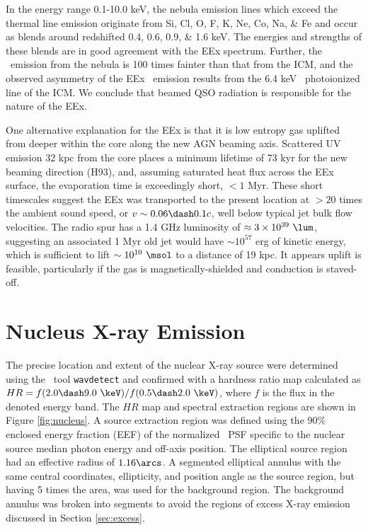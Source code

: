 \documentclass[useAMS,usenatbib]{mn2e}
\begin{document}
In the energy range 0.1-10.0 keV, the nebula emission lines which
exceed the thermal line emission originate from Si, Cl, O, F, K, Ne,
Co, Na, \& Fe and occur as blends around redshifted 0.4, 0.6, 0.9, \&
1.6 keV. The energies and strengths of these blends are in good
agreement with the EEx spectrum. Further, the \feka\ emission from the
nebula is 100 times fainter than that from the ICM, and the observed
asymmetry of the EEx \feka\ emission results from the 6.4 keV
\feka\ photoionized line of the ICM. We conclude that beamed QSO
radiation is responsible for the nature of the EEx.

One alternative explanation for the EEx is that it is low entropy gas
uplifted from deeper within the core along the new AGN beaming
axis. Scattered UV emission 32 kpc from the core places a minimum
lifetime of 73 kyr for the new beaming direction (H93), and, assuming
saturated heat flux across the EEx surface, the evaporation time is
exceedingly short, $< 1$ Myr. These short timescales suggest the EEx
was transported to the present location at $> 20$ times the ambient
sound speed, or $v \sim 0.06 \dash 0.1c$, well below typical jet bulk
flow velocities. The radio spur has a 1.4 GHz luminosity of $\approx 3
\times 10^{39} ~\lum$, suggesting an associated 1 Myr old jet would
have $\sim 10^{57}$ erg of kinetic energy, which is sufficient to lift
$\sim 10^{10} ~\msol$ to a distance of 19 kpc. It appears uplift is
feasible, particularly if the gas is magnetically-shielded and
conduction is staved-off.

\section{Nucleus X-ray Emission}
\label{sec:centsrc}

The precise location and extent of the nuclear X-ray source were
determined using the \ciao\ tool {\tt wavdetect} and confirmed with a
hardness ratio map calculated as $HR = f(2.0 \dash 9.0 ~\keV) / f(0.5
\dash 2.0 ~\keV)$, where $f$ is the flux in the denoted energy
band. The $HR$ map and spectral extraction regions are shown in Figure
\ref{fig:nucleus}. A source extraction region was defined using the
90\% enclosed energy fraction (EEF) of the normalized \chandra\ PSF
specific to the nuclear source median photon energy and off-axis
position. The elliptical source region had an effective radius of
$1.16\arcs$. A segmented elliptical annulus with the same central
coordinates, ellipticity, and position angle as the source region, but
having 5 times the area, was used for the background region. The
background annulus was broken into segments to avoid the regions of
excess X-ray emission discussed in Section \ref{sec:excess}.
\end{document}
